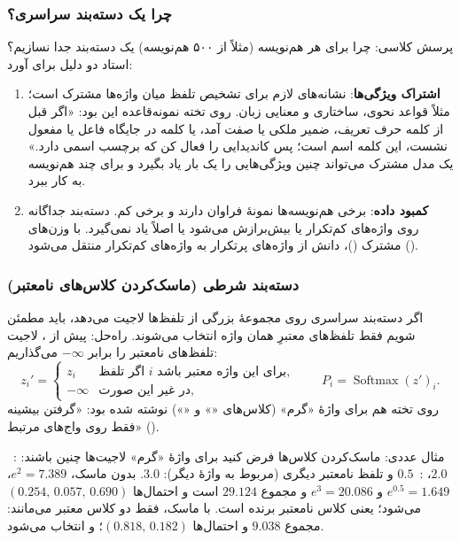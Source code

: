 \subsubsection{چرا یک دسته‌بند سراسری؟}
پرسش کلاسی: چرا برای هر هم‌نویسه (مثلاً از ۵۰۰ هم‌نویسه) یک دسته‌بند جدا نسازیم؟ استاد دو دلیل برای  آورد:
\begin{enumerate}
  \item \textbf{اشتراک ویژگی‌ها}: نشانه‌های لازم برای تشخیص تلفظ میان واژه‌ها مشترک است؛ مثلاً قواعد نحوی، ساختاری و معنایی زبان. روی تخته نمونه‌قاعده این بود: «اگر قبل از کلمه حرف تعریف، ضمیر ملکی یا صفت آمد، یا کلمه در جایگاه فاعل یا مفعول نشست، این کلمه اسم است؛ پس کاندیدایی را فعال کن که برچسب اسمی دارد.» یک مدل مشترک می‌تواند چنین ویژگی‌هایی را یک بار یاد بگیرد و برای چند هم‌نویسه به کار ببرد.
  \item \textbf{کمبود داده}: برخی هم‌نویسه‌ها نمونهٔ فراوان دارند و برخی کم. دسته‌بند جداگانه روی واژه‌های کم‌تکرار یا بیش‌برازش می‌شود یا اصلاً یاد نمی‌گیرد. با وزن‌های مشترک ()، دانش از واژه‌های پرتکرار به واژه‌های کم‌تکرار منتقل می‌شود ().
\end{enumerate}

\subsubsection{دسته‌بند شرطی (ماسک‌کردن کلاس‌های نامعتبر)}
اگر دسته‌بند سراسری روی مجموعهٔ بزرگی از تلفظ‌ها لاجیت می‌دهد، باید مطمئن شویم فقط تلفظ‌های معتبرِ همان واژه انتخاب می‌شوند. راه‌حل: پیش از ، لاجیت تلفظ‌های نامعتبر را برابر $-\infty$ می‌گذاریم:
\[
z_i'=\begin{cases} z_i & \text{اگر تلفظ } i \text{ برای این واژه معتبر باشد},\\ -\infty & \text{در غیر این صورت,}\end{cases}
\qquad P_i=\operatorname{Softmax}(z')_i .
\]
روی تخته هم برای واژهٔ «گرم» (کلاس‌های «» و «») نوشته شده بود: «گرفتن بیشینه فقط روی واج‌های مرتبط» ().

\begin{addedbox}{مثال عددی: ماسک‌کردن کلاس‌ها}
فرض کنید برای واژهٔ «گرم» لاجیت‌ها چنین باشند: :~$2.0$، :~$0.5$ و تلفظ نامعتبر دیگری (مربوط به واژهٔ دیگر): $3.0$. بدون ماسک، \mbox{$e^{2}=7.389$}، \mbox{$e^{0.5}=1.649$} و \mbox{$e^{3}=20.086$} و مجموع $29.124$ است و احتمال‌ها \mbox{$(0.254,\,0.057,\,0.690)$} می‌شود؛ یعنی کلاس نامعتبر برنده است. با ماسک، فقط دو کلاس معتبر می‌مانند: مجموع $9.038$ و احتمال‌ها \mbox{$(0.818,\,0.182)$}؛ و  انتخاب می‌شود.
\end{addedbox}

